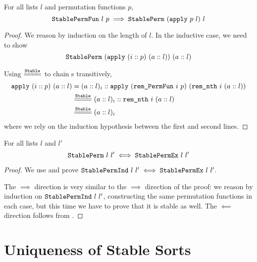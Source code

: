 \documentclass[11pt]{thesis}
\begin{document}
\begin{theorem}
  For all lists $l$ and permutation functions $p$,
  \begin{equation*}
    \texttt{StablePermFun}~l~p \implies \texttt{StablePerm}~(\texttt{apply}~p~l)~l
  \end{equation*}
\end{theorem}
\begin{proof}
  We reason by induction on the length of $l$. In the inductive case,
  we need to show
  \begin{equation*}
    \texttt{StablePerm}~(\texttt{apply}~(i :: p)~(a :: l))~(a :: l)
  \end{equation*}

  Using $\eqstable$ to chain s transitively,
  \begin{align*}
    \var{apply}~(i :: p)~(a :: l)
    &= (a :: l)_i  ::
    \var{apply}~(\var{rem\_PermFun}~i~p)~(\var{rem\_nth}~i~(a :: l)) \\
    &\eqstable (a :: l)_i :: \var{rem\_nth}~i~(a :: l) \\
    &\eqstable (a :: l)_i
  \end{align*}
  where we rely on the induction hypothesis between the first and
  second lines.
\end{proof}

\begin{theorem}
  For all lists $l$ and $l'$
  \begin{equation*}
    \texttt{StablePerm}~l~l' \iff \texttt{StablePermEx}~l~l'
  \end{equation*}
\end{theorem}
\begin{proof}
  We use  and prove $\texttt{StablePermInd}~l~l'
  \iff \texttt{StablePermEx}~l~l'$.

  The $\implies$ direction is very similar to the $\implies$ direction
  of the  proof: we reason by induction on
  $\texttt{StablePermInd}~l~l'$, constructing the same permutation
  functions in each case, but this time we have to prove that it is
  stable as well. The $\impliedby$ direction follows from
  .
\end{proof}

\section{Uniqueness of Stable Sorts}
\label{sec:unique}
\end{document}
